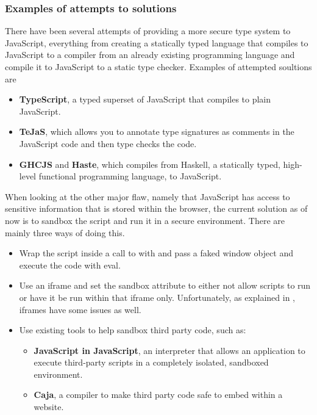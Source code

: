 \subsubsection{Examples of attempts to solutions}
There have been several attempts of providing a more secure type system to JavaScript, everything from creating a statically typed language that compiles to JavaScript to a compiler from an already existing programming language and compile it to JavaScript to a static type checker. Examples of attempted soultions are
\begin{itemize}
  \item \textbf{TypeScript}\cite{typescript}, a typed superset of JavaScript that compiles to plain JavaScript.
  \item \textbf{TeJaS}\cite{tejas-art,tejas-git}, which allows you to annotate type signatures as comments in the JavaScript code and then type checks the code.
  \item \textbf{GHCJS}\cite{ghcjs} and \textbf{Haste}\cite{haste-lang,haste-symposium}, which compiles from Haskell, a statically typed, high-level functional programming language\cite{haskell}, to JavaScript.
\end{itemize}

When looking at the other major flaw, namely that JavaScript has access to sensitive information that is stored within the browser, the current solution as of now is to sandbox the script and run it in a secure environment. There are mainly three ways of doing this.
\begin{itemize}
  \item Wrap the script inside a call to with and pass a faked window object and execute the code with eval.
  \item Use an iframe and set the sandbox attribute to either not allow scripts to run or have it be run within that iframe only. Unfortunately, as explained in \cite{js_in_js}, iframes have some issues as well.
  \item Use existing tools to help sandbox third party code, such as:
    \begin{itemize}
      \item \textbf{JavaScript in JavaScript}\cite{js_in_js}, an interpreter that allows an application to execute third-party scripts in a completely isolated, sandboxed environment.
      \item \textbf{Caja}\cite{caja_spec}, a compiler to make third party code safe to embed within a website.
    \end{itemize}
\end{itemize}


